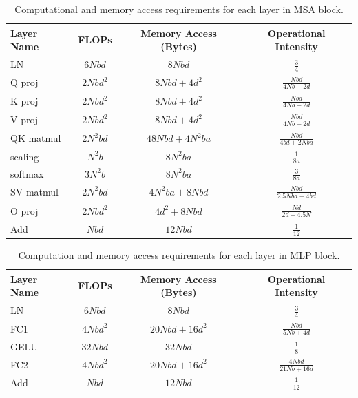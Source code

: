 \documentclass[12pt]{article}
\begin{document}
\begin{table}
    \centering
    \renewcommand{\arraystretch}{1.7} %
    \begin{tabular}{lccc}
    \hline
    \textbf{Layer Name} & \textbf{FLOPs} & \textbf{Memory Access (Bytes)} & \textbf{Operational Intensity} \\
    \hline
    LN         & $6Nbd$   & $8Nbd$                & $\frac{3}{4}$              \\
    Q proj     & $2Nbd^2$ & $8Nbd + 4d^2$         & $\frac{Nbd}{4Nb + 2d}$     \\
    K proj     & $2Nbd^2$ & $8Nbd + 4d^2$         & $\frac{Nbd}{4Nb + 2d}$     \\
    V proj     & $2Nbd^2$ & $8Nbd + 4d^2$         & $\frac{Nbd}{4Nb + 2d}$     \\
    QK matmul  & $2N^2bd$ & $48Nbd + 4N^2ba$      & $\frac{Nbd}{4bd + 2Nba}$   \\
    scaling    & $N^2b$   & $8N^2ba$              & $\frac{1}{8a}$             \\
    softmax    & $3N^2b$  & $8N^2ba$              & $\frac{3}{8a}$             \\
    SV matmul  & $2N^2bd$ & $4N^2ba + 8Nbd$       & $\frac{Nbd}{2.5Nba + 4bd}$ \\
    O proj     & $2Nbd^2$ & $4d^2 + 8Nbd$         & $\frac{Nd}{2d + 4.5N}$     \\
    Add        & $Nbd$    & $12Nbd$               & $\frac{1}{12}$             \\
    \hline
    \end{tabular}
    \caption{Computational and memory access requirements for each layer in MSA block.}
    \label{tab:msa_analysis}
\end{table}

\begin{table}
    \centering
    \renewcommand{\arraystretch}{1.7} %
    \begin{tabular}{lccc}
    \hline
    \textbf{Layer Name} & \textbf{FLOPs} & \textbf{Memory Access (Bytes)} & \textbf{Operational Intensity} \\
    \hline
    LN         & $6Nbd$   & $8Nbd$        & $\frac{3}{4}$           \\
    FC1        & $4Nbd^2$ & $20Nbd + 16d^2$ & $\frac{Nbd}{5Nb + 4d}$    \\
    GELU       & $32Nbd$  & $32Nbd$       & $\frac{1}{8}$           \\
    FC2        & $4Nbd^2$ & $20Nbd + 16d^2$ & $\frac{4Nbd}{21Nb + 16d}$ \\
    Add        & $Nbd$    & $12Nbd$       & $\frac{1}{12}$          \\
    \hline
    \end{tabular}
    \caption{Computation and memory access requirements for each layer in MLP block.}
    \label{tab:mlp_analysis}
\end{table}
\end{document}
